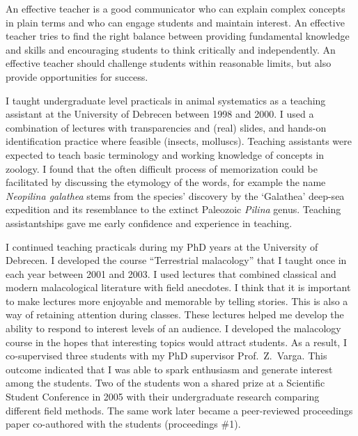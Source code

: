 
An effective teacher is a good communicator who can explain complex concepts in plain terms and who can engage students and maintain interest. An effective teacher tries to find the right balance between providing fundamental knowledge and skills and encouraging students to think critically and independently. An effective teacher should challenge students within reasonable limits, but also provide opportunities for success.
\vspace{0.5pc}

I taught undergraduate level practicals in animal systematics as a teaching assistant at the University of Debrecen between 1998 and 2000. I used a combination of lectures with transparencies and (real) slides, and hands-on identification practice where feasible (insects, molluscs). Teaching assistants were expected to teach basic terminology and working knowledge of concepts in zoology. I found that the often difficult process of memorization could be facilitated by discussing the etymology of the words, for example the name \emph{Neopilina galathea} stems from the species' discovery by the `Galathea' deep-sea expedition and its resemblance to the extinct Paleozoic \emph{Pilina} genus. Teaching assistantships gave me early confidence and experience in teaching.
\vspace{0.5pc}

I continued teaching practicals during my PhD years at the University of Debrecen. I developed the course ``Terrestrial malacology'' that I taught once in each year between 2001 and 2003. I used lectures that combined classical and modern malacological literature with field anecdotes. I think that it is important to make lectures more enjoyable and memorable by telling stories. This is also a way of retaining attention during classes. These lectures helped me develop the ability to respond to interest levels of an audience. I developed the malacology course in the hopes that interesting topics would attract students. As a result, I co-supervised three students with my PhD supervisor Prof.~Z.~Varga. This outcome indicated that I was able to spark enthusiasm and generate interest among the students. Two of the students won a shared prize at a Scientific Student Conference in 2005 with their undergraduate research comparing different field methods. The same work later became a peer-reviewed proceedings paper co-authored with the students (proceedings \#1).
\vspace{0.5pc}

